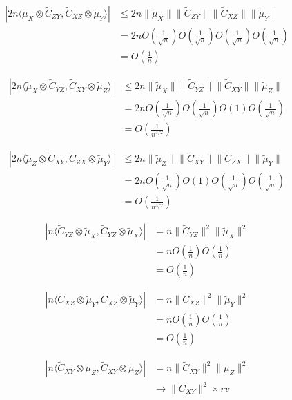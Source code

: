 \documentclass{article}
\begin{document}
\begin{align*}
|2n\langle \tilde{\mu}_X\otimes\tilde{C}_{ZY},\tilde{C}_{XZ}\otimes\tilde{\mu}_Y \rangle| &\leq 2n \|\tilde{\mu}_X\|\|\tilde{C}_{ZY}\|\|\tilde{C}_{XZ}\|\|\tilde{\mu}_Y\| \\& = 
2n O(\frac{1}{\sqrt{n}}) O(\frac{1}{\sqrt{n}}) O(\frac{1}{\sqrt{n}}) O(\frac{1}{\sqrt{n}}) \\&=
O(\frac{1}{n})
\end{align*}

\begin{align*}
|2n\langle \tilde{\mu}_X\otimes\tilde{C}_{YZ},\tilde{C}_{XY}\otimes\tilde{\mu}_Z \rangle| &\leq 2n \|\tilde{\mu}_X\|\|\tilde{C}_{YZ}\|\|\tilde{C}_{XY}\|\|\tilde{\mu}_Z\| \\& = 
2n O(\frac{1}{\sqrt{n}}) O(\frac{1}{\sqrt{n}}) O(1) O(\frac{1}{\sqrt{n}}) \\&=
O(\frac{1}{n^{3/2}})
\end{align*}

\begin{align*}
|2n\langle \tilde{\mu}_Z\otimes\tilde{C}_{XY},\tilde{C}_{ZX}\otimes\tilde{\mu}_Y \rangle| &\leq 2n \|\tilde{\mu}_Z\|\|\tilde{C}_{XY}\|\|\tilde{C}_{ZX}\|\|\tilde{\mu}_Y\| \\& = 
2n O(\frac{1}{\sqrt{n}})  O(1) O(\frac{1}{\sqrt{n}}) O(\frac{1}{\sqrt{n}}) \\&=
O(\frac{1}{n^{3/2}})
\end{align*}

\begin{align*}
|n\langle \tilde{C}_{YZ}\otimes\tilde{\mu}_X,\tilde{C}_{YZ}\otimes\tilde{\mu}_X \rangle| & = n \|\tilde{C}_{YZ}\|^2 \|\tilde{\mu}_X\|^2 \\& = 
n O(\frac{1}{n}) O(\frac{1}{n}) \\& =
O(\frac{1}{n})
\end{align*}

\begin{align*}
|n\langle \tilde{C}_{XZ}\otimes\tilde{\mu}_Y,\tilde{C}_{XZ}\otimes\tilde{\mu}_Y \rangle| & = n \|\tilde{C}_{XZ}\|^2 \|\tilde{\mu}_Y\|^2 \\& = 
n O(\frac{1}{n}) O(\frac{1}{n}) \\& =
O(\frac{1}{n})
\end{align*}


\begin{align*}
|n\langle \tilde{C}_{XY}\otimes\tilde{\mu}_Z,\tilde{C}_{XY}\otimes\tilde{\mu}_Z \rangle| & = n \|\tilde{C}_{XY}\|^2 \|\tilde{\mu}_Z\|^2 \\& \longrightarrow
\|C_{XY}\|^2 \times rv
\end{align*}
\end{document}
